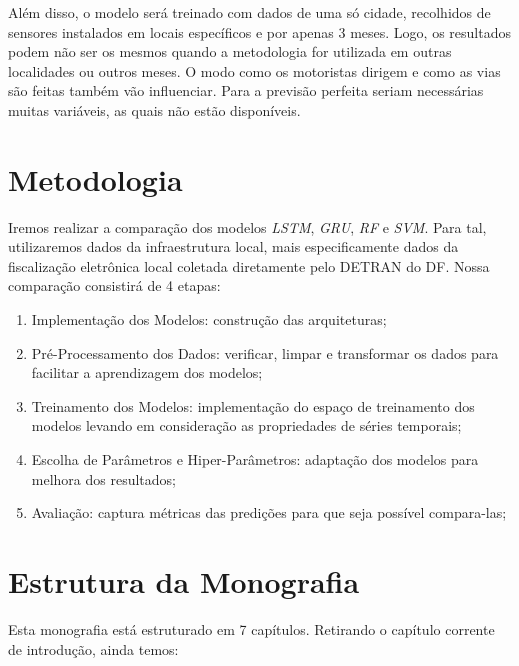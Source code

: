 Além disso, o modelo será treinado com dados de uma só cidade, recolhidos de sensores instalados em locais específicos e por apenas 3 meses. Logo, os resultados podem não ser os mesmos quando a metodologia for utilizada em outras localidades ou outros meses. O modo como os motoristas dirigem e como as vias são feitas também vão influenciar. Para a previsão perfeita seriam necessárias muitas variáveis, as quais não estão disponíveis.

\section{Metodologia}

Iremos realizar a comparação dos modelos  \textit{\acrshort{LSTM}}, \textit{\acrshort{GRU}}, \textit{\acrshort{RF}} e \textit{\acrshort{SVM}}. Para tal, utilizaremos dados da infraestrutura local, mais especificamente dados da fiscalização eletrônica local coletada diretamente pelo \acrfull{DETRAN} do \acrfull{DF}. Nossa comparação consistirá de 4 etapas:

\begin{enumerate}
    \item Implementação dos Modelos: construção das arquiteturas;
    \item Pré-Processamento dos Dados: verificar, limpar e transformar os dados para facilitar a aprendizagem dos modelos;
    \item Treinamento dos Modelos: implementação do espaço de treinamento dos modelos levando em consideração as propriedades de séries temporais;
    \item Escolha de Parâmetros e Hiper-Parâmetros: adaptação dos modelos para melhora dos resultados;
    \item Avaliação: captura métricas das predições para que seja possível compara-las;
\end{enumerate}

\section{Estrutura da Monografia}

Esta monografia está estruturado em 7 capítulos. Retirando o capítulo corrente de introdução, ainda temos:

